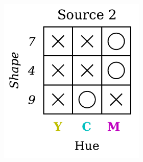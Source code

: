 \begin{definition}
\begin{figure}[H]
\begin{subfigure}[b]{0.45\textwidth}
\begin{subfigure}[b]{0.48\textwidth}
                \includegraphics[width=\textwidth]{img/datasets/3-CGO_fact=hue_env=1.pdf}
            \end{subfigure}
        \end{subfigure}
        \hfill
        \begin{subfigure}[b]{0.45\textwidth}
            \centering
            \begin{subfigure}[b]{0.48\textwidth}
                \centering

\end{subfigure}
\end{subfigure}
\end{figure}
\end{definition}
